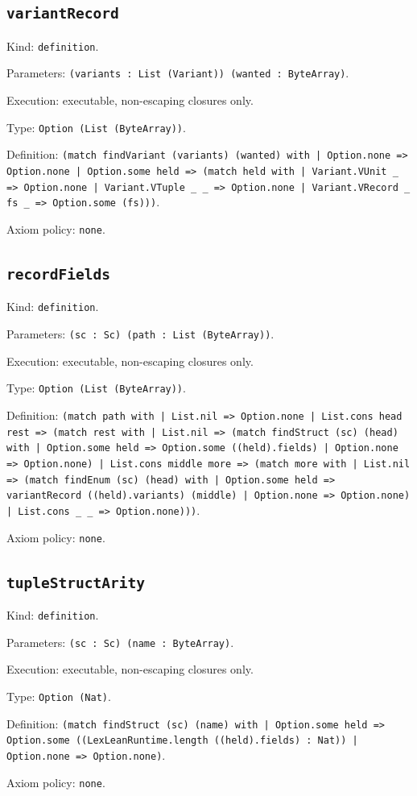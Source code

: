 \documentclass[11pt]{article}
\begin{document}
\subsection*{\texttt{variantRecord}}
\noindent Kind: \texttt{definition}.\par
\noindent Parameters: \texttt{(variants : List (Variant)) (wanted : ByteArray)}.\par
\noindent Execution: executable, non-escaping closures only.\par
\noindent Type: \texttt{Option (List (ByteArray))}.\par
\noindent Definition: \texttt{(match findVariant (variants) (wanted) with | Option.none => Option.none | Option.some held => (match held with | Variant.VUnit \_ => Option.none | Variant.VTuple \_ \_ => Option.none | Variant.VRecord \_ fs \_ => Option.some (fs)))}.\par
\noindent Axiom policy: \texttt{none}.\par
\subsection*{\texttt{recordFields}}
\noindent Kind: \texttt{definition}.\par
\noindent Parameters: \texttt{(sc : Sc) (path : List (ByteArray))}.\par
\noindent Execution: executable, non-escaping closures only.\par
\noindent Type: \texttt{Option (List (ByteArray))}.\par
\noindent Definition: \texttt{(match path with | List.nil => Option.none | List.cons head rest => (match rest with | List.nil => (match findStruct (sc) (head) with | Option.some held => Option.some ((held).fields) | Option.none => Option.none) | List.cons middle more => (match more with | List.nil => (match findEnum (sc) (head) with | Option.some held => variantRecord ((held).variants) (middle) | Option.none => Option.none) | List.cons \_ \_ => Option.none)))}.\par
\noindent Axiom policy: \texttt{none}.\par
\subsection*{\texttt{tupleStructArity}}
\noindent Kind: \texttt{definition}.\par
\noindent Parameters: \texttt{(sc : Sc) (name : ByteArray)}.\par
\noindent Execution: executable, non-escaping closures only.\par
\noindent Type: \texttt{Option (Nat)}.\par
\noindent Definition: \texttt{(match findStruct (sc) (name) with | Option.some held => Option.some ((LexLeanRuntime.length ((held).fields) : Nat)) | Option.none => Option.none)}.\par
\noindent Axiom policy: \texttt{none}.\par
\end{document}
